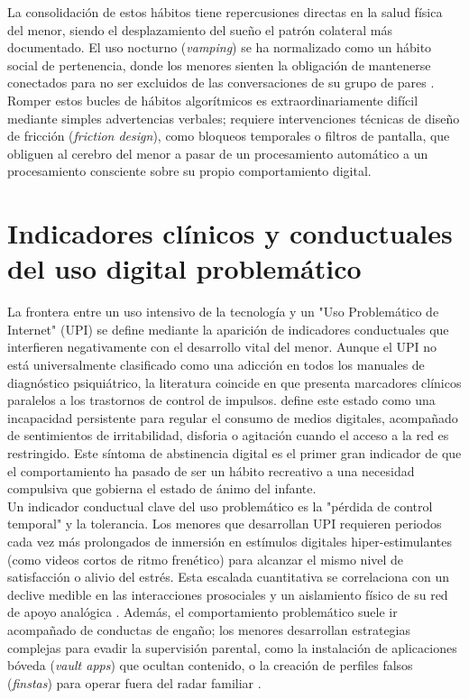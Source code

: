 La consolidación de estos hábitos tiene repercusiones directas en la salud física del menor, siendo el desplazamiento del sueño el patrón colateral más documentado. El uso nocturno (\textit{vamping}) se ha normalizado como un hábito social de pertenencia, donde los menores sienten la obligación de mantenerse conectados para no ser excluidos de las conversaciones de su grupo de pares \cite{soriano-molina_association_2025}. Romper estos bucles de hábitos algorítmicos es extraordinariamente difícil mediante simples advertencias verbales; requiere intervenciones técnicas de diseño de fricción (\textit{friction design}), como bloqueos temporales o filtros de pantalla, que obliguen al cerebro del menor a pasar de un procesamiento automático a un procesamiento consciente sobre su propio comportamiento digital.\\

\section{Indicadores clínicos y conductuales del uso digital problemático}

La frontera entre un uso intensivo de la tecnología y un "Uso Problemático de Internet" (UPI) se define mediante la aparición de indicadores conductuales que interfieren negativamente con el desarrollo vital del menor. Aunque el UPI no está universalmente clasificado como una adicción en todos los manuales de diagnóstico psiquiátrico, la literatura coincide en que presenta marcadores clínicos paralelos a los trastornos de control de impulsos. \cite{selak_problematic_2025} define este estado como una incapacidad persistente para regular el consumo de medios digitales, acompañado de sentimientos de irritabilidad, disforia o agitación cuando el acceso a la red es restringido. Este síntoma de abstinencia digital es el primer gran indicador de que el comportamiento ha pasado de ser un hábito recreativo a una necesidad compulsiva que gobierna el estado de ánimo del infante.\\

Un indicador conductual clave del uso problemático es la "pérdida de control temporal" y la tolerancia. Los menores que desarrollan UPI requieren periodos cada vez más prolongados de inmersión en estímulos digitales hiper-estimulantes (como videos cortos de ritmo frenético) para alcanzar el mismo nivel de satisfacción o alivio del estrés. Esta escalada cuantitativa se correlaciona con un declive medible en las interacciones prosociales y un aislamiento físico de su red de apoyo analógica \cite{masri-zada_impact_2025}. Además, el comportamiento problemático suele ir acompañado de conductas de engaño; los menores desarrollan estrategias complejas para evadir la supervisión parental, como la instalación de aplicaciones bóveda (\textit{vault apps}) que ocultan contenido, o la creación de perfiles falsos (\textit{finstas}) para operar fuera del radar familiar \cite{dumaru_its_2024}.\\

